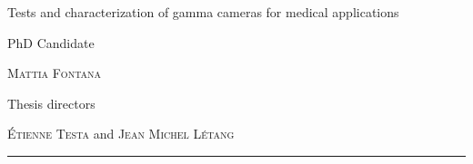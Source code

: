 \begin{titlepage}

\noindent
\textcolor{titlepagecolor}{\titlefont Tests and characterization \newline of gamma
cameras for \newline medical applications}\par
\epigraph{PhD Candidate}%
{\textsc{Mattia Fontana}}

\epigraph{Thesis directors}%
{\textsc{\'{E}tienne Testa} and \textsc{Jean Michel L\'{e}tang}}
\null\vfill
\vspace*{1cm}
\noindent
\hfill
\begin{minipage}{0.35\linewidth}
    \begin{flushright}
        \printuniv
    \end{flushright}
\end{minipage}
%
\begin{minipage}{0.02\linewidth}
    \rule{1pt}{125pt}
\end{minipage}
\titlepagedecoration
\end{titlepage}

